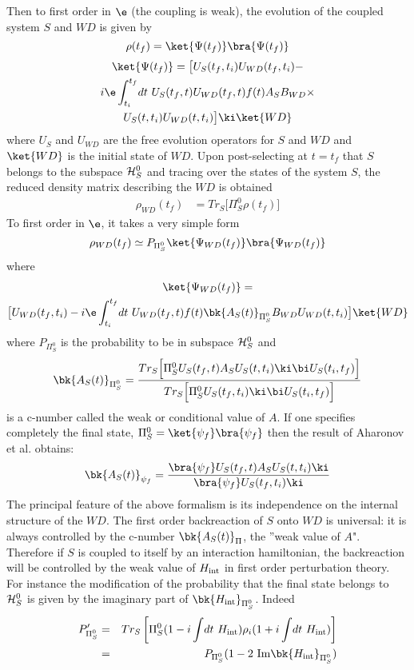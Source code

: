 \documentclass[12pt]{article}
\begin{document}
Then to first order in $\e$ (the coupling is weak), the evolution of the
coupled
system $S$ and $WD$ is given by
$$
\rho(t_f) =\ket{\Psi (t_f)}\bra{\Psi(t_f)}\nonumber\\
$$
\begin{multline}
\ket{\Psi(t_f)} = \bigl [
U_S(t_f,t_i)U_{WD}(t_f,t_i) - \\ 
i\e \int_{t_i}^{t_f}\! dt \
 U_S(t_f,t)U_{WD}(t_f,t)  f(t) A_S B_{WD}\times\\
  U_S(t,t_i)U_{WD}(t,t_i) \bigr] \ki \ket{WD}
\label{weakiii}
 \end{multline}
where $U_S$ and $U_{WD}$ are
the free evolution operators for $S$ and  $WD$ and  $\ket{WD}$ is the initial
state of  $WD$. Upon post-selecting at $t=t_f$ that $S$ belongs to the
subspace ${\cal H}_S^{0}$ and tracing over the  states of the
system $S$, the reduced density matrix describing the $WD$ is obtained
\begin{align}
 \rho_{WD}(t_f) &= Tr_S
 \bigl [ \Pi_S^0 \rho(t_f)
\bigr]\end{align}
To first order in $\e$, it takes a very simple
form 
$$
 \rho_{WD}(t_f)\simeq
P_{\Pi_S^{0}}\ket{\Psi_{WD}(t_f)}
\bra{\Psi_{WD}(t_f)}
$$
where
\begin{multline}
\ket{\Psi_{WD}(t_f)}=\\
\bigl[ U_{WD}(t_f,t_i) -
 i\e
\int_{t_i}^{t_f}\! dt \ U_{WD}(t_f,t)  f(t) \bk{A_{S}(t)}_{\Pi_S^{0}}
B_{WD}U_{WD}(t,t_i)
 \bigr] \ket{WD}
\label{weakiv}
 \end{multline}
where $P_{\Pi_S^{0}}$ is the probability to be in subspace ${\cal H}_S^{0}$
and
  \begin{equation}
\bk{A_{S}(t)}_{\Pi_S^{0}} = {Tr_S
\Bigl [ \Pi_S^{0} U_S(t_f,t) A_S U_S(t,t_i) \ki\bi U_S(t_i,t_f) \Bigr]
\over Tr_S \Bigl [ \Pi_S^{0} U_S(t_f,t_i)\ki\bi U_S(t_i,t_f) \Bigr]}
\label{weakv}
\end{equation}
 is a c-number called  the weak or conditional value of $A$. If
one specifies completely the final state, $\Pi_S^{0} =
\ket{\psi_f}\bra{\psi_f}$  then
the result of Aharonov et al.
obtains:
\begin{equation}
\bk{A_{S}(t)}_{\psi_f} = {\bra{\psi_f}
U_S(t_f,t) A_S U_S(t,t_i) \ki  \over \bra{\psi_f} U_S(t_f,t_i) \ki}
\label{weakvi}
 \end{equation}
The principal feature of the above formalism is its independence on the
internal structure of the $WD$. The first order backreaction of $S$
onto $WD$ is
universal: it is always controlled by the c-number $\bk{A_{S}(t)}_{\Pi}$,
the ''weak
value of $A$". Therefore
if $S$ is coupled to itself by an
interaction hamiltonian, the backreaction
will be controlled by the
weak value of $H_{\rm int}$
in first order perturbation theory.
For instance the modification of the probability that the
final state belongs to ${\cal H}_S^{0}$ is
given by the imaginary part
of $\bk{H_{\rm int}}_{\Pi_S^{0}}$.
Indeed
\begin{eqnarray}
P_{\Pi_S^0}^\prime &=& Tr_S \left[
\Pi_S^0 ( 1 - i \int\! dt\  H_{\rm int} )
\rho_i ( 1 + i \int\! dt\  H_{\rm int} )\right]\nonumber\\
&=&P_{\Pi_S^0} (1 - 2 { \mbox{ Im} \bk{H_{\rm int}}_{\Pi_S^{0}}})
\end{eqnarray}
\end{document}
